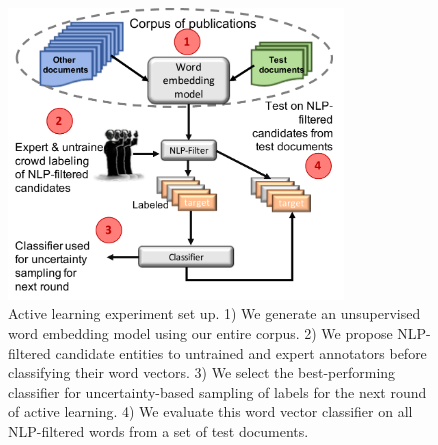\begin{figure}
\centering
\includegraphics[trim=0.15in 0.1in 0in 0.in,clip,width=3.5in]{figures/al_setup.pdf}
\caption{\label{fig:current} Active learning experiment set up. 1) We generate an unsupervised word embedding model using our entire corpus. 2) We propose NLP-filtered candidate entities to untrained and expert annotators before classifying their word vectors. 3) We select the best-performing classifier for uncertainty-based sampling of labels for the next round of active learning. 4) We evaluate this word vector classifier on all NLP-filtered words from a set of test documents. 
}
\end{figure}

